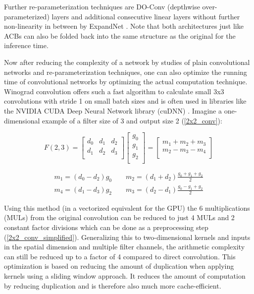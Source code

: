 Further re-parameterization techniques are DO-Conv (depthwise over-parameterized) layers \cite{JinmingCao.2020} and additional consecutive linear layers without further non-linearity in between by ExpandNet \cite{ShuxuanGuo.2021}. Note that both architectures just like ACBs can also be folded back into the same structure as the original for the inference time. 

Now after reducing the complexity of a network by studies of plain convolutional networks and re-parameterization techniques, one can also optimize the running time of convolutional networks by optimizing the actual computation technique. Winograd convolution offers such a fast algorithm to calculate small 3x3 convolutions with stride 1 on small batch sizes and is often used in libraries like the NVIDIA CUDA Deep Neural Network library (cuDNN) \cite{SharanChetlur.2014}. Imagine a one-dimensional example of a filter size of 3 and output size 2 (\autoref{2x2_conv}):

\begin{equation} \label{2x2_conv}
	F(2,3) = \begin{bmatrix}
		d_0 & d_1 & d_2 \\
		d_1 & d_2 & d_3 \\
	\end{bmatrix} \begin{bmatrix}
		g_0 \\
		g_1 \\
		g_2 \\
	\end{bmatrix} = \begin{bmatrix}
		m_1 + m_2 + m_3 \\
		m_2 - m_3 - m_4 \\
	\end{bmatrix}
\end{equation}

\begin{equation} \label{2x2_conv_simplified}
	\begin{array}{c}
		m_1 = (d_0 - d_2) g_0 \qquad m_2 = (d_1 + d_2) \frac{g_0 + g_1 + g_2}{2} \\[6pt]
		m_4 = (d_1 - d_3) g_2 \qquad m_3 = (d_2 - d_1) \frac{g_0 - g_1 + g_2}{2}
	\end{array}
\end{equation}

Using this method (in a vectorized equivalent for the GPU) the 6 multiplications (MULs) from the original convolution can be reduced to just 4 MULs and 2 constant factor divisions which can be done as a preprocessing step (\autoref{2x2_conv_simplified}). Generalizing this to two-dimensional kernels and inputs in the spatial dimension and multiple filter channels, the arithmetic complexity can still be reduced up to a factor of 4 compared to direct convolution. This optimization is based on reducing the amount of duplication when applying kernels using a sliding window approach. It reduces the amount of computation by reducing duplication and is therefore also much more cache-efficient. \cite{AndrewLavin.2015}